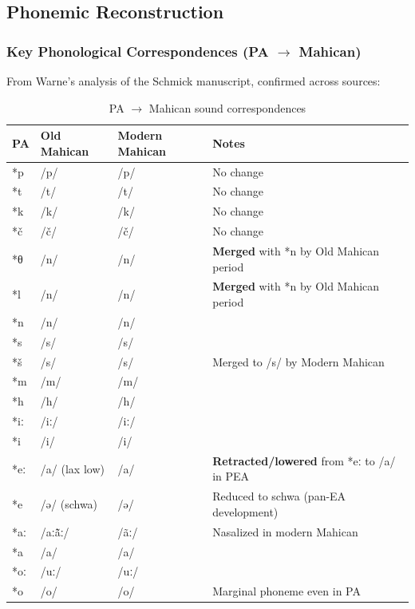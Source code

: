 \subsection{Phonemic Reconstruction}

\subsubsection{Key Phonological Correspondences (PA $\rightarrow$ Mahican)}

From Warne's analysis of the Schmick manuscript, confirmed across sources:

\begin{table}[h]
\centering
\begin{tabular}{llll}
\toprule
\textbf{PA} & \textbf{Old Mahican} & \textbf{Modern Mahican} & \textbf{Notes} \\
\midrule
*p & /p/ & /p/ & No change \\
*t & /t/ & /t/ & No change \\
*k & /k/ & /k/ & No change \\
*č & /č/ & /č/ & No change \\
*θ{} & /n/ & /n/ & \textbf{Merged} with *n by Old Mahican period \\
*l & /n/ & /n/ & \textbf{Merged} with *n by Old Mahican period \\
*n & /n/ & /n/ & \\
*s & /s/ & /s/ & \\
*š & /s/ & /s/ & Merged to /s/ by Modern Mahican \\
*m & /m/ & /m/ & \\
*h & /h/ & /h/ & \\
*iː & /iː/ & /iː/ & \\
*i & /i/ & /i/ & \\
*eː & /a/ (lax low) & /a/ & \textbf{Retracted/lowered} from *eː to /a/ in PEA \\
*e & /ə/ (schwa) & /ə/ & Reduced to schwa (pan-EA development) \\
*aː & /aː\~ãː/ & /ãː/ & Nasalized in modern Mahican \\
*a & /a/ & /a/ & \\
*oː & /uː/ & /uː/ & \\
*o & /o/ & /o/ & Marginal phoneme even in PA \\
\bottomrule
\end{tabular}
\caption{PA $\rightarrow$ Mahican sound correspondences}
\label{tab:1369-correspondences}
\end{table}

